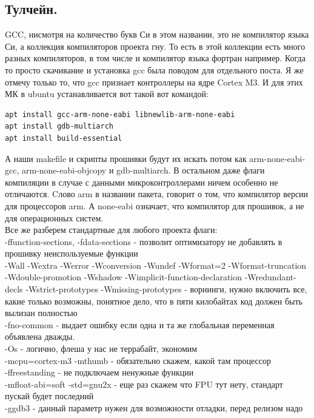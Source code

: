 \documentclass[12pt,a4paper]{article}
\begin{document}
\subsection{Тулчейн.}
    GCC, нисмотря на количество букв Си в этом названии, это не компилятор
    языка Си, а коллекция компиляторов проекта гну. То есть в этой коллекции есть много
    разных компиляторов, в том числе и компилятор языка фортран например.
    Когда то просто скачивание и установка gcc была поводом для отдельного поста.
    Я же отмечу только то, что gcc признает контроллеры на ядре Cortex M3. И
    для этих МК в ubuntu устанавливается вот такой вот командой:
\begin{lstlisting}
apt install gcc-arm-none-eabi libnewlib-arm-none-eabi
apt install gdb-multiarch
apt install build-essential
\end{lstlisting}
    А наши makefile и скрипты прошивки будут их искать потом как
    arm-none-eabi-gcc, arm-none-eabi-objcopy и gdb-multiarch.
    В остальном даже флаги компиляции в случае с данными микроконтроллерами
    ничем особенно не отличаются. Cлово arm в названии пакета, говорит о том, что
    компилятор версии для процессоров arm. А none-eabi означает, что компилятор
    для прошивок, а не для операционных систем.\\
    Все же разберем стандартные для любого проекта флаги:\\
    -ffunction-sections, -fdata-sections - позволит оптимизатору не добавлять в
    прошивку неиспользуемые функции\\
    -Wall -Wextra -Werror -Wconversion -Wundef -Wformat=2 -Wformat-truncation
    -Wdouble-promotion -Wshadow -Wimplicit-function-declaration
    -Wredundant-decls -Wstrict-prototypes -Wmissing-prototypes
    - ворнинги, нужно включить все, какие только возможны,
    понятное дело, что в пяти килобайтах код должен быть вылизан полностью\\
    -fno-common - выдает ошибку если одна и та же глобальная переменная
    объявлена дважды.\\
    -Os - логично, флеша у нас не террабайт, экономим\\
    -mcpu=cortex-m3 -mthumb - обязательно скажем, какой там процессор\\
    -ffreestanding - не подключаем ненужные функции\\
    -mfloat-abi=soft -std=gnu2x - еще раз скажем что FPU тут нету, стандарт
    пускай будет последний\\
    -ggdb3 - данный параметр нужен для возможности отладки, перед релизом надо
\end{document}
